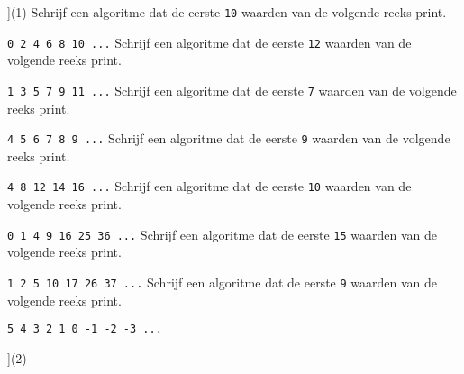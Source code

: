 \begin{exercise}
    \begin{longtasks}[counter-format=7.tsk[1]](1)
        \task
        Schrijf een algoritme dat de eerste \texttt{10} waarden van de volgende reeks print.
        
        \texttt{0 2 4 6 8 10 ...}
        \task
        Schrijf een algoritme dat de eerste \texttt{12} waarden van de volgende reeks print.

        \texttt{1 3 5 7 9 11 ...}
        \task
        Schrijf een algoritme dat de eerste \texttt{7} waarden van de volgende reeks print.

        \texttt{4 5 6 7 8 9 ...}
        \task
        Schrijf een algoritme dat de eerste \texttt{9} waarden van de volgende reeks print.

        \texttt{4 8 12 14 16 ...}
        \task
        Schrijf een algoritme dat de eerste \texttt{10} waarden van de volgende reeks print.

        \texttt{0 1 4 9 16 25 36 ...}
        \task
        Schrijf een algoritme dat de eerste \texttt{15} waarden van de volgende reeks print.

        \texttt{1 2 5 10 17 26 37 ...}
        \task
        Schrijf een algoritme dat de eerste \texttt{9} waarden van de volgende reeks print.

        \texttt{5 4 3 2 1 0 -1 -2 -3 ...}
    \end{longtasks}
\end{exercise}

\begin{solution}
    \begin{mltasks}[counter-format=7.tsk[1]](2)
        \task {}
        \task {}
        \task {}
        \task {}
        \task {}
        \task {}
        \task {}
    \end{mltasks}
\end{solution}
